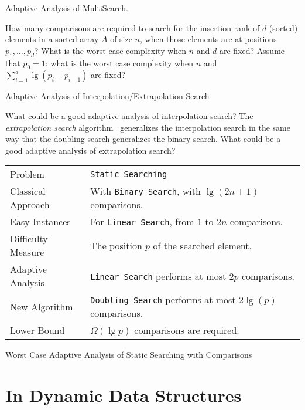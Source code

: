 \begin{homework}[e]
  \caption{Adaptive Analysis of MultiSearch. \label{hmw:multiSearch}}  
  How many comparisons are required to search for the insertion rank
  of $d$ (sorted) elements in a sorted array $A$ of size $n$, when
  those elements are at positions $p_1,\ldots,p_d$?  What is the worst
  case complexity when $n$ and $d$ are fixed?  Assume that $p_0=1$:
  what is the worst case complexity when $n$ and $\sum_{i=1}^d
  \lg(p_i-p_{i-1})$ are fixed?
\end{homework}

\begin{openproblem}
\caption{Adaptive Analysis of Interpolation/Extrapolation Search}
  What could be a good adaptive analysis of interpolation search?
   The {\em extrapolation search}
  algorithm~\cite{fasterAdaptiveSetIntersectionsForTextSearching}
  generalizes the interpolation search in the same way that the
  doubling search generalizes the binary search. What could be a good
  adaptive analysis of extrapolation search?
\end{openproblem}


\begin{adaptiveanalysis}
  \begin{tabular}{@{\bf}p{}p{}}
    Problem            & {\tt Static Searching}\\               
    Classical Approach & With {\tt Binary Search}, with $\lg(2n+1)$ comparisons.\\
    Easy Instances     & For {\tt Linear Search}, from $1$ to $2n$ comparisons.\\
    Difficulty Measure & The position $p$ of the searched element.\\
    Adaptive Analysis  & {\tt Linear Search} performs at most $2p$ comparisons.\\
    New Algorithm      & {\tt Doubling Search} performs at most $2\lg(p)$ comparisons. \\
    Lower Bound        & $\Omega(\lg p)$ comparisons are required.\\
  \end{tabular}
  \caption{Worst Case Adaptive Analysis of Static Searching with
    Comparisons}
  \label{tab:staticSearching}
\end{adaptiveanalysis}

\section{In Dynamic Data Structures}
\label{sec:dynam-data-struct}

